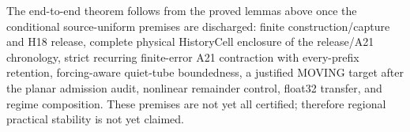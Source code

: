 \documentclass[journal]{IEEEtran}
\begin{document}
\begin{theorem}
The end-to-end theorem follows from the proved lemmas above once the conditional source-uniform premises are discharged: finite construction/capture and H18 release, complete physical HistoryCell enclosure of the release/A21 chronology, strict recurring finite-error A21 contraction with every-prefix retention, forcing-aware quiet-tube boundedness, a justified MOVING target after the planar admission audit, nonlinear remainder control, float32 transfer, and regime composition.  These premises are not yet all certified; therefore regional practical stability is not yet claimed.
\end{theorem}

\begingroup
\renewcommand{\thesubsection}{\thesection-\arabic{subsection}}
\renewcommand{\thesubsectiondis}{\arabic{subsection}.}
\renewcommand{\theparagraph}{\thesubsubsection-\arabic{paragraph}}
\renewcommand{\theparagraphdis}{\arabic{paragraph})}

\endgroup
\end{document}
